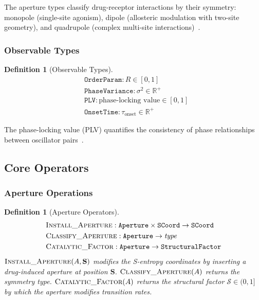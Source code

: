 \documentclass[10pt,twocolumn]{article}
\newtheorem{definition}[theorem]{Definition}
\theoremstyle{remark}
\newcommand{\Scoord}{\mathbf{S}}
\begin{document}
The aperture types classify drug-receptor interactions by their symmetry: monopole (single-site agonism), dipole (allosteric modulation with two-site geometry), and quadrupole (complex multi-site interactions)~\cite{kenakin2017pharmacology,roth2004multiplicity}.

\subsubsection{Observable Types}

\begin{definition}[Observable Types]
\label{def:obs_types}
\begin{align}
&\texttt{OrderParam} : R \in [0,1] \label{eq:type_op} \\
&\texttt{PhaseVariance} : \sigma^2 \in \mathbb{R}^+ \label{eq:type_pv} \\
&\texttt{PLV} : \text{phase-locking value} \in [0,1] \label{eq:type_plv} \\
&\texttt{OnsetTime} : \tau_{\mathrm{onset}} \in \mathbb{R}^+ \label{eq:type_ot}
\end{align}
\end{definition}

The phase-locking value (PLV) quantifies the consistency of phase relationships between oscillator pairs~\cite{lachaux1999measuring}.

\subsection{Core Operators}

\subsubsection{Aperture Operations}

\begin{definition}[Aperture Operators]
\label{def:aperture_ops}
\begin{align}
&\textsc{Install\_Aperture} : \texttt{Aperture} \times \texttt{SCoord} \to \texttt{SCoord} \notag \\
&\textsc{Classify\_Aperture} : \texttt{Aperture} \to \textit{type} \notag \\
&\textsc{Catalytic\_Factor} : \texttt{Aperture} \to \texttt{StructuralFactor} \notag
\end{align}
$\textsc{Install\_Aperture}(A, \Scoord)$ modifies the S-entropy coordinates by inserting a drug-induced aperture at position $\Scoord$. $\textsc{Classify\_Aperture}(A)$ returns the symmetry type. $\textsc{Catalytic\_Factor}(A)$ returns the structural factor $\mathcal{S} \in (0,1]$ by which the aperture modifies transition rates.
\end{definition}
\end{document}
